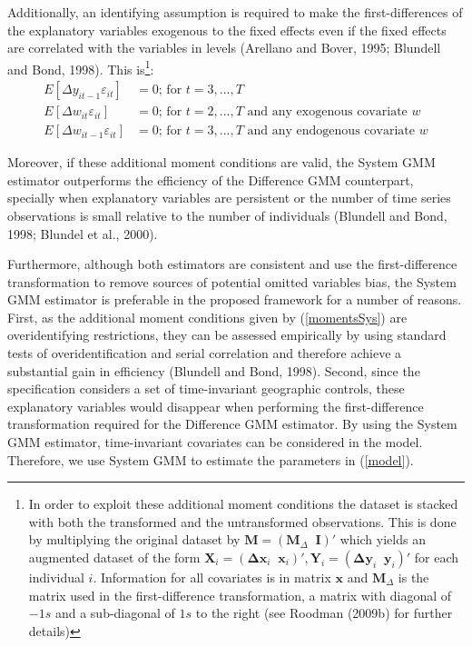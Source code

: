 Additionally, an identifying assumption is required to make the first-differences of the explanatory variables exogenous to the fixed effects even if the fixed effects are correlated with the variables in levels (Arellano and Bover, 1995; Blundell and Bond, 1998). This is\footnote{In order to exploit these additional moment conditions the dataset is stacked with both the transformed and the untransformed observations. This is done by multiplying the original dataset by $\mathbf{M}=\left(\mathbf{M}_{\Delta}\;\;\mathbf{I}\right)'$ which yields an augmented dataset of the form $\mathbf{X}_{i}=\left(\mathbf{\Delta x}_{i}\;\;\mathbf{x}_i\right)', \mathbf{Y}_{i}=\left(\mathbf{\Delta y}_{i}\;\;\mathbf{y}_i\right)'$ for each individual $i$. Information for all covariates is in matrix $\mathbf{x}$ and $\mathbf{M}_{\Delta}$ is the matrix used in the first-difference transformation, a matrix with diagonal of $-1s$ and a sub-diagonal of $1s$ to the right (see Roodman (2009b) for further details)}:
\begin{equation}
\label{momentsSys}
\begin{aligned}
E\left[\Delta y_{it-1}\varepsilon_{it}\right]&=0 \text{; for $t=3,...,T$}\\
E\left[\Delta w_{it}\varepsilon_{it}\right]&=0 \text{; for $t=2,...,T$ and any exogenous covariate $w$}\\
E\left[\Delta w_{it-1}\varepsilon_{it}\right]&=0 \text{; for $t=3,...,T$ and any endogenous covariate $w$}
\end{aligned}
\end{equation}

Moreover, if these additional moment conditions are valid, the System GMM estimator outperforms the efficiency of the Difference GMM counterpart, specially when explanatory variables are persistent or the number of time series observations is small relative to the number of individuals (Blundell and Bond, 1998; Blundel et al., 2000). 

Furthermore, although both estimators are consistent and use the first-difference transformation to remove sources of potential omitted variables bias, the System GMM estimator is preferable in the proposed framework for a number of reasons. First, as the additional moment conditions given by (\ref{momentsSys}) are overidentifying restrictions, they can be assessed empirically by using standard tests of overidentification and serial correlation and therefore achieve a substantial gain in efficiency (Blundell and Bond, 1998). Second, since the specification considers a set of time-invariant geographic controls, these explanatory variables would disappear when performing the first-difference transformation required for the Difference GMM estimator. By using the System GMM estimator, time-invariant covariates can be considered in the model. Therefore, we use System GMM to estimate the parameters in (\ref{model}).

